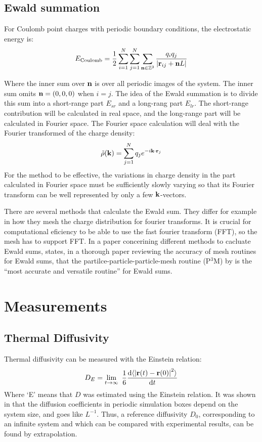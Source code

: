 \subsection{Ewald summation}
For Coulomb point charges with periodic boundary conditions, the electrostatic energy is:
\begin{equation}
	E_{\text{Coulomb}} = \frac{1}{2} \sum_{i=1}^N\sum_{j=1}^N \sum_{\mathbf{n} \in \mathbb{Z}^3} \frac{q_iq_j}{|\mathbf{r}_{ij}+\mathbf{n} L|} 
\end{equation}

Where the inner sum over $\mathbf{n}$ is over all periodic images of the system. The inner sum omits $\mathbf{n} = (0, 0, 0)$ when $i=j$. The idea of the Ewald summation is to divide this sum into a short-range part $E_{sr}$ and a long-rang part $E_{lr}$. The short-range contribution will be calculated in real space, and the long-range part will be calculated in Fourier space. The Fourier space calculation will deal with the Fourier transformed of the charge density:
\begin{equation}
	\tilde{\rho}(\mathbf{k}) = \sum_{j=1}^N q_j e^{-i\mathbf{k}\cdot \mathbf{r}_j}
\end{equation}
For the method to be effective, the variations in charge density in the part calculated in Fourier space must be sufficiently slowly varying so that its Fourier transform can be well represented by only a few $\mathbf{k}$-vectors.

There are several methods that calculate the Ewald sum. They differ for example in how they mesh the charge distribution for fourier transforms. It is crucial for computational eficiency to be able to use the fast fourier transform (FFT), so the mesh has to support FFT. In a paper concerining different methods to cacluate Ewald sums, \citet{Deserno1998} states, in a thorough paper reviewing the accuracy of mesh routines for Ewald sums, that the partilce-particle-particle-mesh routine (P$^3$M) by \citet{Hockney:1988:CSU:62815} is the ``most accurate and versatile routine'' for Ewald sums. 

\section{Measurements}

\subsection{Thermal Diffusivity}
Thermal diffusivity can be measured with the Einstein relation:
\begin{equation}
	D_E = \lim_{t\to\infty} \frac{1}{6} \frac{\dd \langle \left|\rvec(t) - \rvec(0)\right|^2\rangle}{\dd t}
	\label{eq:Einstein_diffusivity}
\end{equation}
Where `E' means that $D$ was estimated using the Einstein relation. It was shown in \cite{Yeh2004} that the diffusion coefficients in periodic simulation boxes depend on the system size, and goes like $L^{-1}$. Thus, a reference diffusivity $D_0$, corresponding to an infinite system and which can be compared with experimental results, can be found by extrapolation.

